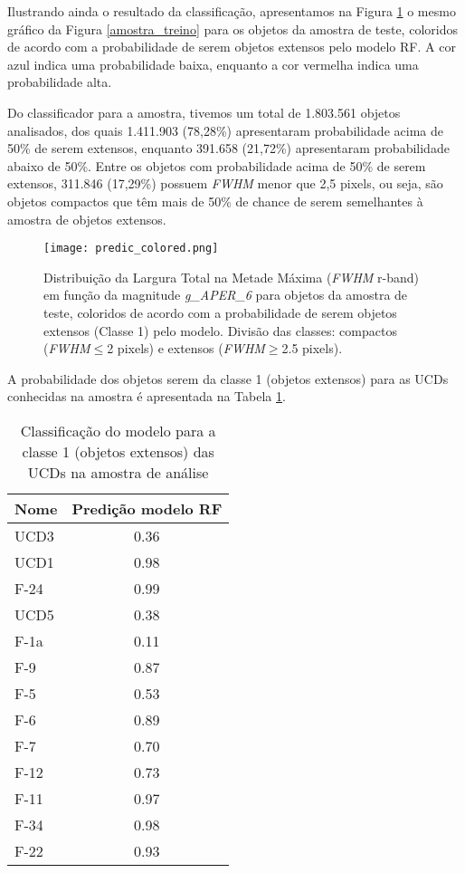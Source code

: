 Ilustrando ainda o resultado da classificação, apresentamos na Figura \ref{predic_colored} o mesmo gráfico da Figura \ref{amostra_treino} para os objetos da amostra de teste, coloridos de acordo com a probabilidade de serem objetos extensos pelo modelo RF. A cor azul indica uma probabilidade baixa, enquanto a cor vermelha indica uma probabilidade alta. 

Do classificador para a amostra, tivemos um total de 1.803.561 objetos analisados, dos quais 1.411.903 (78,28\%) apresentaram probabilidade acima de 50\% de serem extensos, enquanto 391.658 (21,72\%) apresentaram probabilidade abaixo de 50\%. Entre os objetos com probabilidade acima de 50\% de serem extensos, 311.846 (17,29\%) possuem \textit{FWHM} menor que 2,5 pixels, ou seja, são objetos compactos que têm mais de 50\% de chance de serem semelhantes à amostra de objetos extensos.

\begin{figure}[!ht]
    \centering
    \texttt{[image: predic\_colored.png]}
    \caption[]{Distribuição da Largura Total na Metade Máxima (\textit{FWHM} r-band) em função da magnitude \textit{g\_APER\_6} para objetos da amostra de teste, coloridos de acordo com a probabilidade de serem objetos extensos (Classe 1) pelo modelo. Divisão das classes: compactos (\textit{FWHM}$\leq$2 pixels) e extensos (\textit{FWHM}$\geq$2.5 pixels).}
    \label{predic_colored}
\end{figure}

A probabilidade dos objetos serem da classe 1 (objetos extensos) para as UCDs conhecidas na amostra é apresentada na Tabela \ref{ucds_predict}.

\begin{table}[H]
    \centering
    \caption{Classificação do modelo para a classe 1 (objetos extensos) das UCDs na amostra de análise}  
    \begin{tabular}{lc}
        \toprule
        Nome & Predição modelo RF \\
        \midrule
        UCD3 & 0.36 \\
        UCD1 & 0.98 \\
        F-24 & 0.99 \\
        UCD5 & 0.38 \\
        F-1a & 0.11 \\
        F-9 & 0.87 \\
        F-5 & 0.53 \\
        F-6 & 0.89 \\
        F-7 & 0.70 \\
        F-12 & 0.73 \\
        F-11 & 0.97 \\
        F-34 & 0.98 \\
        F-22 & 0.93 \\
        \bottomrule
    \end{tabular}
    \label{ucds_predict}
\end{table}

